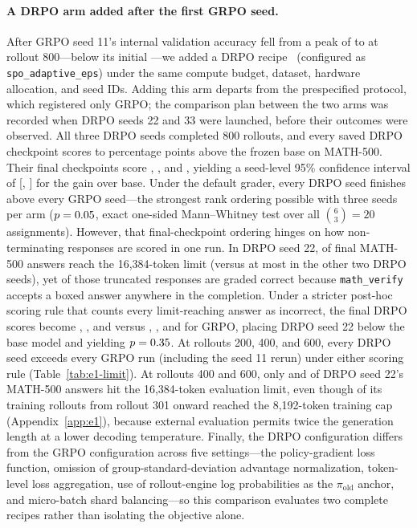 \documentclass[10pt]{article}
\begin{document}
\paragraph{A DRPO arm added after the first GRPO seed.}
After GRPO seed 11's internal validation accuracy fell from a peak of \EOneValidGRPOElevenPeak{} to \EOneValidGRPOElevenEnd{} at rollout 800---below its initial \EOneValidGRPOElevenStart{}---we added a DRPO recipe~\citep{yao2026rethinking} (configured as \texttt{spo\_adaptive\_eps}) under the same compute budget, dataset, hardware allocation, and seed IDs.
Adding this arm departs from the prespecified protocol, which registered only GRPO; the comparison plan between the two arms was recorded when DRPO seeds 22 and 33 were launched, before their outcomes were observed.
All three DRPO seeds completed 800 rollouts, and every saved DRPO checkpoint scores \EOneMathDRPOGainMin{} to \EOneMathDRPOGainMax{} percentage points above the frozen base on MATH-500.
Their final checkpoints score \EOneMathDRPOEndEleven{}, \EOneMathDRPOEndTwentyTwo{}, and \EOneMathDRPOEndThirtyThree{}, yielding a seed-level 95\% confidence interval of [\EOneMathDRPOChangeLow{}, \EOneMathDRPOChangeHigh{}] for the gain over base.
Under the default grader, every DRPO seed finishes above every GRPO seed---the strongest rank ordering possible with three seeds per arm ($p = 0.05{}$, exact one-sided Mann--Whitney test over all $\binom{6}{3}=20$ assignments).
However, that final-checkpoint ordering hinges on how non-terminating responses are scored in one run.
In DRPO seed 22, \EOneLimitDRPOTwentyTwo{} of final MATH-500 answers reach the 16,384-token limit (versus at most \EOneLimitDRPOOthersMax{} in the other two DRPO seeds), yet \EOneLimitCorrectDRPOTwentyTwo{} of those truncated responses are graded correct because \texttt{math\_verify} accepts a boxed answer anywhere in the completion.
Under a stricter post-hoc scoring rule that counts every limit-reaching answer as incorrect, the final DRPO scores become \EOneStrictDRPOEleven{}, \EOneStrictDRPOTwentyTwo{}, and \EOneStrictDRPOThirtyThree{} versus \EOneStrictGRPOEleven{}, \EOneStrictGRPOTwentyTwo{}, and \EOneStrictGRPOThirtyThree{} for GRPO, placing DRPO seed 22 below the base model and yielding $p = 0.35{}$.
At rollouts 200, 400, and 600, every DRPO seed exceeds every GRPO run (including the seed 11 rerun) under either scoring rule (Table~\ref{tab:e1-limit}).
At rollouts 400 and 600, only \EOneLimitDRPOTwentyTwoMiddle{} and \EOneLimitDRPOTwentyTwoEarlier{} of DRPO seed 22's MATH-500 answers hit the 16,384-token evaluation limit, even though \EOneCapDRPOTwentyTwo{} of its training rollouts from rollout 301 onward reached the 8,192-token training cap (Appendix~\ref{app:e1}), because external evaluation permits twice the generation length at a lower decoding temperature.
Finally, the DRPO configuration differs from the GRPO configuration across five settings---the policy-gradient loss function, omission of group-standard-deviation advantage normalization, token-level loss aggregation, use of rollout-engine log probabilities as the $\pi_{\text{old}}$ anchor, and micro-batch shard balancing---so this comparison evaluates two complete recipes rather than isolating the objective alone.
\end{document}
